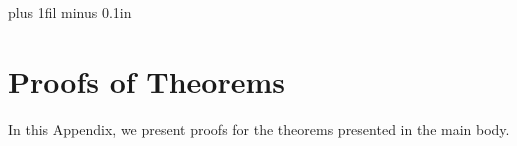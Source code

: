 \documentclass[twoside]{article}
\begin{document}

\appendix






\clearpage
\onecolumn

\thispagestyle{empty}
  \hsize\textwidth
  \linewidth\hsize {}
 \bottomtitlebar \vskip 0.2in plus 1fil minus 0.1in

\section{Proofs of Theorems}

In this Appendix, we present proofs for the theorems presented in the main
body.
\end{document}
